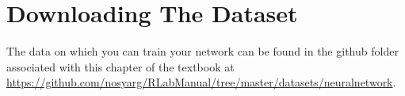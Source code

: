 \section{Downloading The Dataset}

The data on which you can train your network can be found in the github folder associated with this chapter of the textbook at \url{https://github.com/nosyarg/RLabManual/tree/master/datasets/neuralnetwork}.\cite{berkeleyearth}

